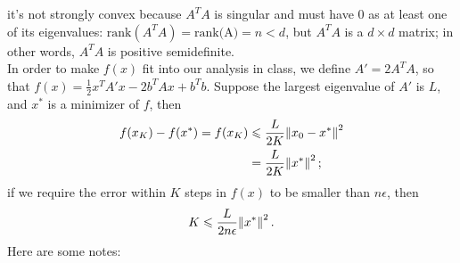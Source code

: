 \documentclass[11pt]{article}
\begin{document}
it's not strongly convex because $A^TA$ is singular and must have $0$ as at least one of its eigenvalues: $\text{rank}(A^TA) = \text{rank}($A$) = n < d$, but $A^TA$ is a $d\times d$ matrix; in other words, $A^TA$ is positive semidefinite.\\[0.3cm]
In order to make $f(x)$ fit into our analysis in class, we define $A' = 2A^TA$, so that $f(x) = \frac12 x^TA'x-2b^TAx+b^Tb$. Suppose the largest eigenvalue of $A'$ is $L$, and $x^*$ is a minimizer of $f$, then
\begin{equation}\begin{split} 
f(x_K) - f(x^*) = f(x_K) &\leqslant \frac L{2K}\norm{x_0-x^*}^2\\
&=\frac L{2K}\norm{x^*}^2;
\end{split}\nonumber\end{equation}
if we require the error within $K$ steps in $f(x)$ to be smaller than $n\epsilon$, then 
$$K \leqslant \frac L{2n\epsilon}\norm{x^*}^2.$$
Here are some notes:
\end{document}
